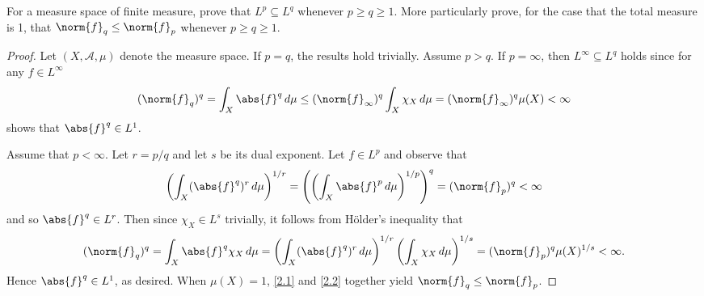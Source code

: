 \documentclass[12pt]{amsart}
\begin{document}
\begin{thm}[p. 436, Problem 1]\label{ex2}
  For a measure space of finite measure, prove that $L^p \subseteq L^q$ whenever $p \geq q \geq 1$.
  More particularly prove, for the case that the total measure is 1, that $\norm{f}_q \leq \norm{f}_p$ whenever $p \geq q \geq 1$.
  
  \begin{proof}
    Let $(X, \mathcal{A}, \mu)$ denote the measure space.
    If $p = q$, the results hold trivially.
    Assume $p > q$.
    If $p = \infty$, then $L^\infty \subseteq L^q$ holds since for any $f \in L^\infty$
    \begin{equation}\label{2.1}
      (\norm{f}_q)^q = \int_X \abs{f}^q\, d\mu \leq (\norm{f}_\infty)^q \int_X \chi_X\, d\mu = (\norm{f}_\infty)^q \mu(X) < \infty
    \end{equation}
    shows that $\abs{f}^q \in L^1$.
    
    Assume that $p < \infty$.
    Let $r = p/q$ and let $s$ be its dual exponent.
    Let $f \in L^p$ and observe that
    $$\left(\int_X (\abs{f}^q)^r\, d\mu\right)^{1/r} = \left(\left(\int_X \abs{f}^p\, d\mu\right)^{1/p}\right)^q = (\norm{f}_p)^q < \infty$$
    and so $\abs{f}^q \in L^r$.
    Then since $\chi_X \in L^s$ trivially, it follows from H\"older's inequality that
    \begin{equation}\label{2.2}
      (\norm{f}_q)^q = \int_X \abs{f}^q\chi_X\, d\mu = \left(\int_X (\abs{f}^q)^r\, d\mu\right)^{1/r} \left(\int_X \chi_X\, d\mu\right)^{1/s} = (\norm{f}_p)^q \mu(X)^{1/s}< \infty.
    \end{equation}
    Hence $\abs{f}^q \in L^1$, as desired.
    When $\mu(X) = 1$, \eqref{2.1} and \eqref{2.2} together yield $\norm{f}_q \leq \norm{f}_p$.
  \end{proof}
\end{thm}

\newpage
\end{document}
